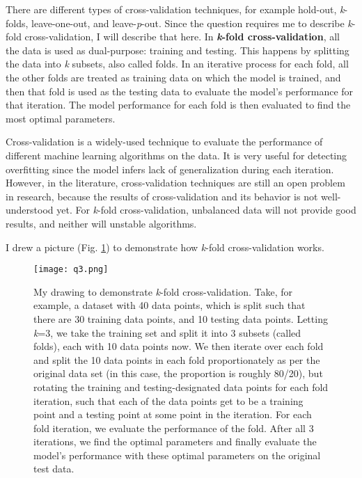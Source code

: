 \documentclass{article}
\begin{document}
There are different types of cross-validation techniques, for example hold-out, \textit{k}-folds, leave-one-out, and leave-\textit{p}-out. Since the question requires me to describe \textit{k}-fold cross-validation, I will describe that here. In \textbf{\textit{k}-fold cross-validation}, all the data is used as dual-purpose: training and testing. This happens by splitting the data into \textit{k} subsets, also called folds. In an iterative process for each fold, all the other folds are treated as training data on which the model is trained, and then that fold is used as the testing data to evaluate the model's performance for that iteration. The model performance for each fold is then evaluated to find the most optimal parameters.

Cross-validation is a widely-used technique to evaluate the performance of different machine learning algorithms on the data. It is very useful for detecting overfitting since the model infers lack of generalization during each iteration. However, in the literature, cross-validation techniques are still an open problem in research, because the results of cross-validation and its behavior is not well-understood yet. For \textit{k}-fold cross-validation, unbalanced data will not provide good results, and neither will unstable algorithms.

I drew a picture (Fig. \ref{fig2}) to demonstrate how \textit{k}-fold cross-validation works.

\begin{figure}
    \centering
    \texttt{[image: q3.png]}
    \caption{My drawing to demonstrate \textit{k}-fold cross-validation. Take, for example, a dataset with 40 data points, which is split such that there are 30 training data points, and 10 testing data points. Letting \textit{k}=3, we take the training set and split it into 3 subsets (called folds), each with 10 data points now. We then iterate over each fold and split the 10 data points in each fold proportionately as per the original data set (in this case, the proportion is roughly 80/20), but rotating the training and testing-designated data points for each fold iteration, such that each of the data points get to be a training point and a testing point at some point in the iteration. For each fold iteration, we evaluate the performance of the fold. After all 3 iterations, we find the optimal parameters and finally evaluate the model's performance with these optimal parameters on the original test data.}
    \label{fig2}
\end{figure}
\end{document}
